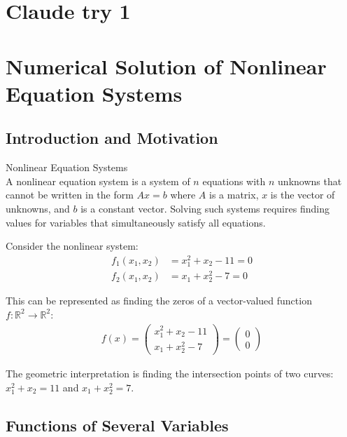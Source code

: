 \raggedcolumns

\section{Claude try 1}

\section{Numerical Solution of Nonlinear Equation Systems}

\subsection{Introduction and Motivation}

\begin{definition}{Nonlinear Equation Systems}\\
A nonlinear equation system is a system of $n$ equations with $n$ unknowns that cannot be written in the form $Ax = b$ where $A$ is a matrix, $x$ is the vector of unknowns, and $b$ is a constant vector. Solving such systems requires finding values for variables that simultaneously satisfy all equations.
\end{definition}

\begin{example}
Consider the nonlinear system:
\begin{align*}
f_1(x_1, x_2) &= x_1^2 + x_2 - 11 = 0\\
f_2(x_1, x_2) &= x_1 + x_2^2 - 7 = 0
\end{align*}

This can be represented as finding the zeros of a vector-valued function $f: \mathbb{R}^2 \rightarrow \mathbb{R}^2$:
\begin{align*}
f(x) = \begin{pmatrix} x_1^2 + x_2 - 11 \\ x_1 + x_2^2 - 7 \end{pmatrix} = \begin{pmatrix} 0 \\ 0 \end{pmatrix}
\end{align*}

The geometric interpretation is finding the intersection points of two curves: $x_1^2 + x_2 = 11$ and $x_1 + x_2^2 = 7$.
\end{example}

\subsection{Functions of Several Variables}

